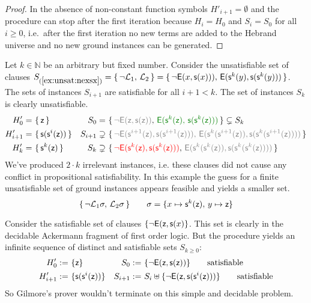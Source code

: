 \begin{proof}
	In the absence of non-constant function symbols $H'_{i+1} = \emptyset$ and
	the procedure can stop after the first iteration because 
	$H_i = H_0$ and $S_i = S_0$ for all $i\geq0$,
	i.e.~after the first iteration 
	no new terms are added to the Hebrand universe 
	and no new ground instances can be generated.
\end{proof}
%

\begin{example}\label{ex:unsat:nexsx}
	Let $k\in\mathbb{N}$ be an arbitrary but fixed number.
	Consider the unsatisfiable set of clauses
	$S_{(\ref{ex:unsat:nexsx})} = \{\, \lnot{\mathcal L}_1,\,{\mathcal L}_2\, \} =
	\{\,
	{ \lnot{\mathsf{E}}(x, {\mathsf s}(x)))},\, 
	{ {\mathsf{E}}({\mathsf s}^{k}(y), {\mathsf s}({\mathsf s}^{k}(y)))}
	\,\}$.
	The sets of instances $S_{i+1}$ are satisfiable for all $i+1<k$.
	The set of instances $S_{k}$ is clearly unsatisfiable.
	\begin{align*}
	H'_{0} =&\ \{\,\mzero\,\} 
	&
	S_{0} =&\ \{\, 
	{\colG \lnot\mE(\mzero,\msucc(\mzero))},\,
	{\colHi \mE(\msucc^k(\mzero),\,\msucc(\msucc^k(\mzero)))}
	\,\}
	\subsetneq S_k
	\\
	H'_{i+1} =&\ \{\,\msucc(\msucc^{i}(\mzero))\,\}
	&
	S_{i+1} \supsetneq&\
	\{\,
	{\colG \lnot\mE(\msucc^{i+1}(\mzero),\msucc(\msucc^{i+1}(\mzero))),\,
	\mE(\msucc^k(\msucc^{i+1}(\mzero)), \msucc(\msucc^k(\msucc^{i+1}(\mzero))))}
	\,\}
	\\
	H'_{k} =&\ \{\,\msucc^{k}(\mzero)\,\} 
	&
	S_{k} \supsetneq&\
	\{\,
	{\colLo \lnot\mE(\msucc^{k}(\mzero),\msucc(\msucc^{k}(\mzero)))},\,
	{\colG\mE(\msucc^k(\msucc^{k}(\mzero)), \msucc(\msucc^k(\msucc^{k}(\mzero))))}
	\,\}
	\end{align*}
	We've produced $2\cdot k$ {\myem irrelevant} instances, i.e. these clauses did not cause any conflict in 
	propositional satisfiability. 
	In this example the guess for a finite unsatisfiable set of ground instances appears feasible and yields a smaller set.
	\[
	\{\, 
	\lnot{\mathcal L}_1\sigma,\,{\mathcal L}_2\sigma
	\,\} \qquad \sigma=\{x\mapsto {\mathsf s}^k({\mathsf z}),\,y\mapsto {\mathsf z}\}
	\]
\end{example}

\begin{example}\label{ex:sat:exy}
	Consider the satisfiable set of clauses $\{\lnot{\mathsf{E}}({\mathsf z},{\mathsf s}(x)\}$.
	This set is clearly in the decidable Ackermann fragment of first order logic.
	But the procedure yields an infinite sequence of distinct and satisfiable sets $S_{k\geq0}$:
	\begin{align*}
	H'_{0} :=&\  \{ {\mathsf z} \} 
	&
	S_{0} :=&\ \{ \lnot{\mathsf{E}}({\mathsf z},{\mathsf s}({\mathsf z}))
	\}
	\tag*{satisfiable}
	\\
	H'_{i+1} :=&\ \{ {\mathsf s}({\mathsf s}^{i}({\mathsf z})) \} 
	&
	S_{i+1} :=&\ S_i \uplus 
	\{
	\lnot{\mathsf{E}}({\mathsf z},{\mathsf s}({\mathsf s}^i({\mathsf z})))
	\}
	\tag*{satisfiable}
	\end{align*}
	So Gilmore's prover wouldn't terminate on this simple and decidable problem.
\end{example}



